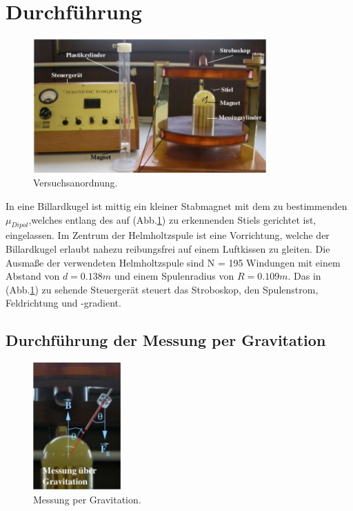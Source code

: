 \newpage

\section{Durchführung}
\label{sec:Durchführung}

\begin{figure}
  \centering
  \includegraphics[width=0.8\textwidth]{content/images/bild1.pdf}
  \caption{Versuchsanordnung.}
  \label{fig:1}
\end{figure}

In eine Billardkugel ist mittig ein kleiner Stabmagnet mit
dem zu bestimmenden $\mu_{Dipol}$,welches entlang
des auf (Abb.\ref{fig:1}) zu erkennenden Stiels
gerichtet ist, eingelassen. Im Zentrum der Helmholtzspule
ist eine Vorrichtung, welche der Billardkugel erlaubt nahezu
reibungsfrei auf einem Luftkissen zu gleiten.
Die Ausmaße der verwendeten Helmholtzspule sind N = 195 Windungen mit
einem Abstand von $d = 0.138m$ und einem Spulenradius von $R = 0.109m$.
Das in (Abb.\ref{fig:1}) zu sehende Steuergerät steuert das Stroboskop, den Spulenstrom,
 Feldrichtung und -gradient.


 \subsection{Durchführung der Messung per Gravitation}
 \label{ssec:DurchGrav}

 \begin{figure}
   \centering
   \includegraphics[width=0.3\textwidth]{content/images/bild3.pdf}
   \caption{Messung per Gravitation.}
   \label{fig:2}
 \end{figure}

